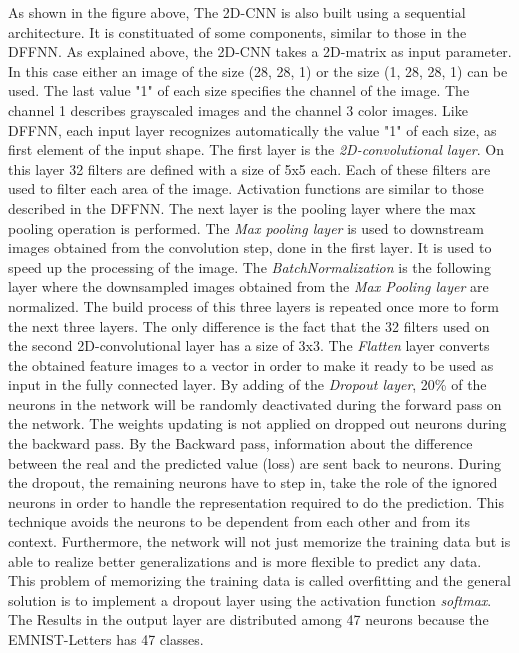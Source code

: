 \noindent
As shown in the figure above, The 2D-CNN is also built using a sequential architecture. 
It is constituated of some components, similar to those in the DFFNN. 
As explained above, the 2D-CNN takes a 2D-matrix as input parameter. In this case either an image of the  
size (28, 28, 1) or the size (1, 28, 28, 1) can be used.
The last value "1" of each size specifies the channel of the image. The channel 1 describes grayscaled images and the channel 3 color images.
Like DFFNN, each input layer recognizes automatically the value "1" of each size, as first element of the input shape.
The first layer is the \emph{2D-convolutional layer}. On this layer 32 filters are defined with a size of 5x5 each.
Each of these filters are used to filter each area of the image. 
Activation functions are similar to those described in the DFFNN. 
The next layer is the pooling layer where the max pooling operation is performed. The \emph{Max pooling layer} is used to downstream 
images obtained from the convolution step, done in the first layer. 
It is used to speed up the processing of the image. 
The \emph{BatchNormalization} is the following layer where the downsampled images obtained from the \emph{Max Pooling layer} are normalized. 
The build process of this three layers is repeated once more to form the next three layers. 
The only difference is the fact that the 32 filters used on the second 2D-convolutional layer has a size of 3x3. 
The \emph{Flatten} layer converts the obtained feature images to a vector in order to make it ready to be used as input in the fully connected 
layer. 
By adding of the \emph{Dropout layer}, 20\% of the neurons in the network will be randomly deactivated during the forward pass on the network.
The weights updating is not applied on dropped out neurons during the backward pass. 
By the Backward pass, information about the difference between the real and the predicted value (loss) are sent back to neurons. 
During the dropout, the remaining neurons have to step in, take the role of the ignored neurons in order to 
handle the representation required to do the prediction. 
This technique avoids the neurons to be dependent from each other and from its context.  
Furthermore, the network will not just memorize the training data but is able to 
realize better generalizations and is more flexible to predict any data. 
This problem of memorizing the training data is called overfitting and the general solution is to implement a 
dropout layer using the activation function \emph{softmax}.  
The Results in the output layer are distributed among 47 neurons because the EMNIST-Letters has 47 classes.


